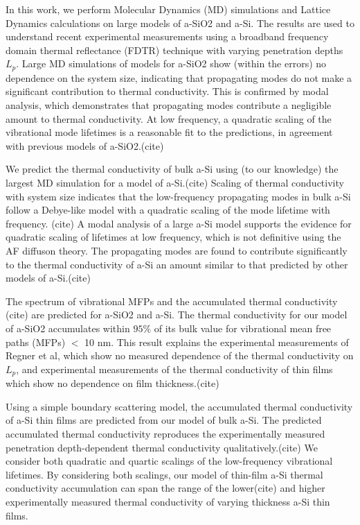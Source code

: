 \documentclass[aps,prb,onecolumn,preprint,superscriptaddress,footinbib,amsmath,amssymb,floatfix]{revtex4}
\begin{document}
In this work, we perform Molecular Dynamics (MD) simulations and 
Lattice Dynamics calculations on  
large models of a-SiO2 and a-Si. The results are used to 
understand recent experimental measurements using a broadband 
frequency domain thermal reflectance (FDTR) technique with varying 
penetration depths $L_p$.\cite{regner_broadband_2013}
Large MD 
simulations of models for a-SiO2 show (within the errors) no 
dependence on the system size, indicating that propagating modes 
do not make a significant contribution to thermal conductivity. 
This is confirmed by modal analysis, which demonstrates that 
propagating modes contribute a negligible amount to thermal 
conductivity. At low frequency, a quadratic scaling of the 
vibrational mode lifetimes is a reasonable fit to the predictions, 
in agreement with previous models of a-SiO2.(cite)

We predict the thermal conductivity of bulk a-Si using (to our 
knowledge) the largest MD simulation for a model of a-Si.(cite) 
Scaling 
of thermal conductivity with system size indicates that the 
low-frequency propagating modes in bulk a-Si follow a Debye-like model 
with a quadratic scaling of the mode lifetime with frequency.
(cite) 
A modal analysis of a large a-Si model supports the evidence 
for quadratic scaling of lifetimes at low frequency,  
which is not definitive using the AF diffuson theory.
\cite{feldman_thermal_1993,feldman_numerical_1999} The propagating 
modes are found to contribute significantly to the thermal 
conductivity of a-Si an amount similar to that predicted by 
other models of a-Si.(cite)

The spectrum of vibrational MFPs and the accumulated thermal conductivity
(cite) 
are predicted for a-SiO2 and a-Si. The thermal conductivity for our model 
of a-SiO2 accumulates within $95\%$ of its bulk value for vibrational 
mean free paths (MFPs) $<$ 10 nm. 
This result explains the experimental measurements 
of Regner et al, which show no measured dependence of the thermal 
conductivity on $L_p$,\cite{regner_broadband_2013} and experimental 
measurements of the thermal conductivity of thin films which 
show no dependence on film thickness.(cite) 

Using a simple boundary scattering model, the accumulated thermal 
conductivity of a-Si thin films are predicted from our model 
of bulk a-Si. The predicted accumulated thermal conductivity 
reproduces the experimentally measured penetration depth-dependent 
thermal conductivity qualitatively.(cite) We consider both 
quadratic and quartic 
scalings of the low-frequency 
vibrational lifetimes. 
By considering both scalings, our model of thin-film a-Si thermal 
conductivity accumulation can span the range of the 
lower(cite) and 
higher\cite{liu_high_2009,yang_anomalously_2010} 
experimentally measured thermal conductivity of varying thickness 
a-Si thin films. 
\end{document}

